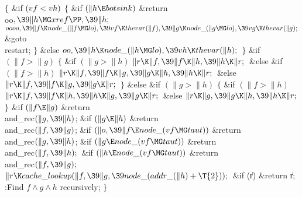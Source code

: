 ${}\{{}$\1\6
\&{if} ${}(\\{vf}<\\{vh}){}$\5
${}\{{}$\1\6
\&{if} ${}(\|h\E\\{botsink}){}$\1\5
\&{return} \\{oo}${},\39\|h\MG\\{xref}\PP,\39\|h;{}$\2\6
${}\\{oooo},\39\|f\K\\{node\_}(\|f\MG\\{lo}),\39\\{vf}\K\\{thevar}(\|f),\39\|g%
\K\\{node\_}(\|g\MG\\{lo}),\39\\{vg}\K\\{thevar}(\|g);{}$\6
\&{goto} \\{restart};\6
\4${}\}{}$\2\6
\&{else}\1\5
${}\\{oo},\39\|h\K\\{node\_}(\|h\MG\\{lo}),\39\\{vh}\K\\{thevar}(\|h);{}$\2\6
\4${}\}{}$\2\6
\&{if} ${}(\|f>\|g){}$\5
${}\{{}$\1\6
\&{if} ${}(\|g>\|h){}$\1\5
${}\|r\K\|f,\39\|f\K\|h,\39\|h\K\|r;{}$\2\6
\&{else} \&{if} ${}(\|f>\|h){}$\1\5
${}\|r\K\|f,\39\|f\K\|g,\39\|g\K\|h,\39\|h\K\|r;{}$\2\6
\&{else}\1\5
${}\|r\K\|f,\39\|f\K\|g,\39\|g\K\|r;{}$\2\6
\4${}\}{}$\5
\2\&{else} \&{if} ${}(\|g>\|h){}$\5
${}\{{}$\1\6
\&{if} ${}(\|f>\|h){}$\1\5
${}\|r\K\|f,\39\|f\K\|h,\39\|h\K\|g,\39\|g\K\|r;{}$\2\6
\&{else}\1\5
${}\|r\K\|g,\39\|g\K\|h,\39\|h\K\|r;{}$\2\6
\4${}\}{}$\2\6
\&{if} ${}(\|f\E\|g){}$\1\5
\&{return} \\{and\_rec}${}(\|g,\39\|h){}$;\2\6
\&{if} ${}(\|g\E\|h){}$\1\5
\&{return} \\{and\_rec}${}(\|f,\39\|g){}$;\2\6
\&{if} ${}(\|o,\39\|f\E\\{node\_}(\\{vf}\MG\\{taut})){}$\1\5
\&{return} \\{and\_rec}${}(\|g,\39\|h){}$;\2\6
\&{if} ${}(\|g\E\\{node\_}(\\{vf}\MG\\{taut})){}$\1\5
\&{return} \\{and\_rec}${}(\|f,\39\|h);{}$\2\6
\&{if} ${}(\|h\E\\{node\_}(\\{vf}\MG\\{taut})){}$\1\5
\&{return} \\{and\_rec}${}(\|f,\39\|g);{}$\2\6
${}\|r\K\\{cache\_lookup}(\|f,\39\|g,\39\\{node\_}(\\{addr\_}(\|h)+\T{2}));{}$\6
\&{if} (\|r)\1\5
\&{return} \|r;\2\6
:Find $f\land g\land h$ recursively\X;\6
\4${}\}{}$\2\par
\fi

